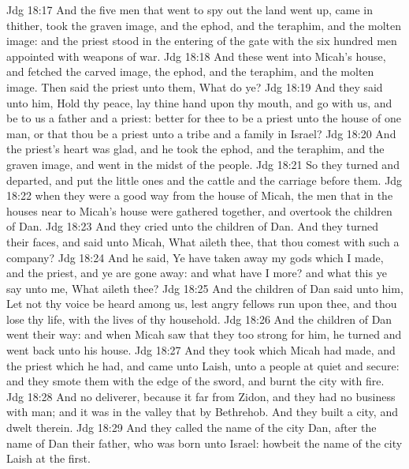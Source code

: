 \vs Jdg 18:17 And the five men that went to spy out the land went up,  came in thither,  took the graven image, and the ephod, and the teraphim, and the molten image: and the priest stood in the entering of the gate with the six hundred men  appointed with weapons of war.
\vs Jdg 18:18 And these went into Micah's house, and fetched the carved image, the ephod, and the teraphim, and the molten image. Then said the priest unto them, What do ye?
\vs Jdg 18:19 And they said unto him, Hold thy peace, lay thine hand upon thy mouth, and go with us, and be to us a father and a priest:  better for thee to be a priest unto the house of one man, or that thou be a priest unto a tribe and a family in Israel?
\vs Jdg 18:20 And the priest's heart was glad, and he took the ephod, and the teraphim, and the graven image, and went in the midst of the people.
\vs Jdg 18:21 So they turned and departed, and put the little ones and the cattle and the carriage before them.
\vs Jdg 18:22  when they were a good way from the house of Micah, the men that  in the houses near to Micah's house were gathered together, and overtook the children of Dan.
\vs Jdg 18:23 And they cried unto the children of Dan. And they turned their faces, and said unto Micah, What aileth thee, that thou comest with such a company?
\vs Jdg 18:24 And he said, Ye have taken away my gods which I made, and the priest, and ye are gone away: and what have I more? and what  this  ye say unto me, What aileth thee?
\vs Jdg 18:25 And the children of Dan said unto him, Let not thy voice be heard among us, lest angry fellows run upon thee, and thou lose thy life, with the lives of thy household.
\vs Jdg 18:26 And the children of Dan went their way: and when Micah saw that they  too strong for him, he turned and went back unto his house.
\vs Jdg 18:27 And they took  which Micah had made, and the priest which he had, and came unto Laish, unto a people  at quiet and secure: and they smote them with the edge of the sword, and burnt the city with fire.
\vs Jdg 18:28 And  no deliverer, because it  far from Zidon, and they had no business with  man; and it was in the valley that  by Bethrehob. And they built a city, and dwelt therein.
\vs Jdg 18:29 And they called the name of the city Dan, after the name of Dan their father, who was born unto Israel: howbeit the name of the city  Laish at the first.

